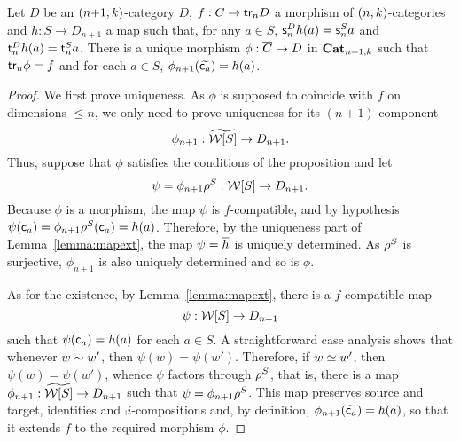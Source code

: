 \begin{proposition}\label{prop:univprop}
   Let $D$ be an  $(n{+}1,k)$-category $D$, $f:C\to\mathsf{tr}_{n} D$ a
   morphism of $(n,k)$-categories
   and  $h:S\to D_{n+1}$ a map such that, for any $a\in S$, $\mathsf{s}_{n}^Dh(a)=\mathsf{s}_{n}^S a$
    and $\mathsf{t}_{n}^D h(a)=\mathsf{t}_{n}^S a$.  There is a unique
    morphism $\phi:\overline{C}\to D$ in $\mathbf{Cat}_{n+1,k}$ such that $\mathsf{tr}_{n}\phi=f$ and for each $a\in S$, $\phi_{n+1}(\widetilde{\mathsf{c}_{a}})=h(a)$.
  \end{proposition}
  \begin{proof}
We first prove uniqueness. As $\phi$ is supposed to coincide with $f$ on
dimensions $\leq n$, we only need to prove uniqueness for its
$(n{+}1)$-component
\[\phi_{n+1}:\widetilde{\mathcal{W}[S]}\to D_{n+1}.\]
 Thus, suppose
that $\phi$ satisfies the conditions of the proposition and let
\[\psi=\phi_{n+1} \rho^{S}:\mathcal{W}[S]\to D_{n+1}.\]
   Because $\phi$ is a morphism, the  map $\psi$ is
   $f$-compatible, and by hypothesis $\psi(\mathsf{c}_{a})=\phi_{n+1}\rho^{S}(\mathsf{c}_{a})=h(a)$. Therefore, by the uniqueness
   part of
   Lemma~\ref{lemma:mapext}, the map $\psi=\overline{h}$ is uniquely determined.
As $\rho^{S}$  is surjective,
  $\phi_{n+1}$ is also uniquely determined and so is $\phi$.

  As for the existence, by Lemma~\ref{lemma:mapext}, there is a
  $f$-compatible map
  \[\psi:\mathcal{W}[S]\to D_{n+1}\]
  such that $\psi(\mathsf{c}_{a})=h(a)$ for each $a\in S$. 
  A straightforward case analysis shows that whenever $w\sim w'$,
  then $\psi(w)=\psi(w')$. Therefore, if $w\simeq w'$, then
  $\psi(w)=\psi(w')$, whence $\psi$ factors through $\rho^{S}$, that
  is, there is a map $\phi_{n+1}:\widetilde{\mathcal{W}[S]}\to D_{n+1}$ such that
  $\psi=\phi_{n+1}\rho^{S}$. This map preserves source and target,
  identities and $\comp i$-compositions and, by definition, $\phi_{n+1}(\widetilde{\mathsf{c}_{a}})=h(a)$, so that it extends $f$ to the required morphism $\phi$. 
\end{proof}
